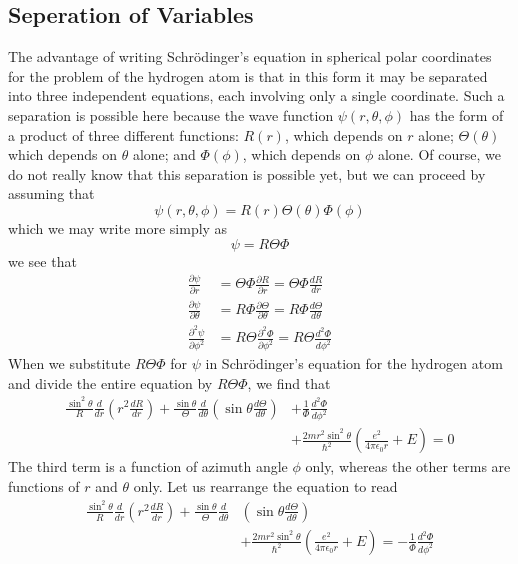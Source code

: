 \subsection{Seperation of Variables}
The advantage of writing Schrödinger's equation in spherical polar coordinates for the problem of the hydrogen atom is that in this form it may be separated into three independent equations, each involving only a single coordinate. Such a separation is possible here because the wave function $\psi(r, \theta, \phi)$ has the form of a product of three different functions: $R(r)$, which depends on $r$ alone; $\Theta(\theta)$ which depends on $\theta$ alone; and $\Phi(\phi)$, which depends on $\phi$ alone. Of course, we do not really know that this separation is possible yet, but we can proceed by assuming that\\
$$\psi(r, \theta, \phi)=R(r) \Theta(\theta) \Phi(\phi)$$
which we may write more simply as
$$
\psi=R \Theta \Phi
$$
we see that
$$
\begin{aligned}
\frac{\partial \psi}{\partial r} &=\Theta \Phi \frac{\partial R}{\partial r}=\Theta \Phi \frac{d R}{d r} \\
\frac{\partial \psi}{\partial \theta} &=R \Phi \frac{\partial \Theta}{\partial \theta}=R \Phi \frac{d \Theta}{d \theta} \\
\frac{\partial^{2} \psi}{\partial \phi^{2}} &=R \Theta \frac{\partial^{2} \Phi}{\partial \phi^{2}}=R \Theta \frac{d^{2} \Phi}{d \phi^{2}}
\end{aligned}
$$
When we substitute $R \Theta \Phi$ for $\psi$ in Schrödinger's equation for the hydrogen atom and divide the entire equation by $R \Theta \Phi$, we find that
$$
\begin{aligned}
\frac{\sin ^{2} \theta}{R} \frac{d}{d r}\left(r^{2} \frac{d R}{d r}\right)+\frac{\sin \theta}{\Theta} \frac{d}{d \theta}\left(\sin \theta \frac{d \Theta}{d \theta}\right) &+\frac{1}{\Phi} \frac{d^{2} \Phi}{d \phi^{2}} \\
&+\frac{2 m r^{2} \sin ^{2} \theta}{\hbar^{2}}\left(\frac{e^{2}}{4 \pi \epsilon_{0} r}+E\right)=0
\end{aligned}
$$
The third term  is a function of azimuth angle $\phi$ only, whereas the other terms are functions of $r$ and $\theta$ only.
Let us rearrange the equation to read
$$
\begin{aligned}
\frac{\sin ^{2} \theta}{R} \frac{d}{d r}\left(r^{2} \frac{d R}{d r}\right)+\frac{\sin \theta}{\Theta} \frac{d}{d \theta} &\left(\sin \theta \frac{d \Theta}{d \theta}\right) \\
&+\frac{2 m r^{2} \sin ^{2} \theta}{\hbar^{2}}\left(\frac{e^{2}}{4 \pi \epsilon_{0} r}+E\right)=-\frac{1}{\Phi} \frac{d^{2} \Phi}{d \phi^{2}}
\end{aligned}
$$
